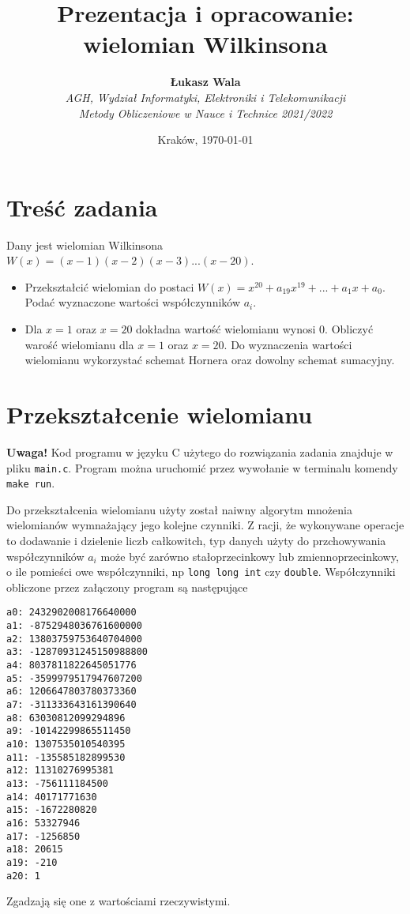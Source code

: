 \documentclass{article}
\title{Prezentacja i opracowanie: wielomian Wilkinsona}
\author{\textbf{Łukasz Wala}\\
    \textit{AGH, Wydział Informatyki, Elektroniki i Telekomunikacji} \\
    \textit{Metody Obliczeniowe w Nauce i Technice 2021/2022}}
\date{Kraków, \today}
\begin{document}
\maketitle

\section{Treść zadania}
Dany jest wielomian Wilkinsona $W(x)=(x-1)(x-2)(x-3)...(x-20)$.
\begin{itemize}
    \item
    Przekształcić wielomian do postaci $W(x)=x^{20}+a_{19}x^{19}+...+a_1x+a_0$. Podać wyznaczone wartości współczynników $a_i$.
    \item
    Dla $x=1$ oraz $x=20$ dokładna wartość wielomianu wynosi $0$. Obliczyć warość wielomianu dla $x=1$ oraz $x=20$. Do wyznaczenia wartości wielomianu wykorzystać schemat Hornera oraz dowolny schemat sumacyjny.
\end{itemize}

\section{Przekształcenie wielomianu}
\textbf{Uwaga!} Kod programu w języku C użytego do rozwiązania zadania znajduje w pliku \verb|main.c|.
Program można uruchomić przez wywołanie w terminalu komendy \verb|make run|.

Do przekształcenia wielomianu użyty został naiwny algorytm mnożenia wielomianów wymnażający jego kolejne czynniki.
Z racji, że wykonywane operacje to dodawanie i dzielenie liczb całkowitch, typ danych użyty do przchowywania współczynników $a_i$
może być zarówno stałoprzecinkowy lub zmiennoprzecinkowy, o ile pomieści owe współczynniki, np \verb|long long int| czy \verb|double|.
Współczynniki obliczone przez załączony program są następujące
\begin{verbatim}
a0: 2432902008176640000
a1: -8752948036761600000
a2: 13803759753640704000
a3: -12870931245150988800
a4: 8037811822645051776
a5: -3599979517947607200
a6: 1206647803780373360
a7: -311333643161390640
a8: 63030812099294896
a9: -10142299865511450
a10: 1307535010540395
a11: -135585182899530
a12: 11310276995381
a13: -756111184500
a14: 40171771630
a15: -1672280820
a16: 53327946
a17: -1256850
a18: 20615
a19: -210
a20: 1
\end{verbatim}
Zgadzają się one z wartościami rzeczywistymi.
\end{document}
